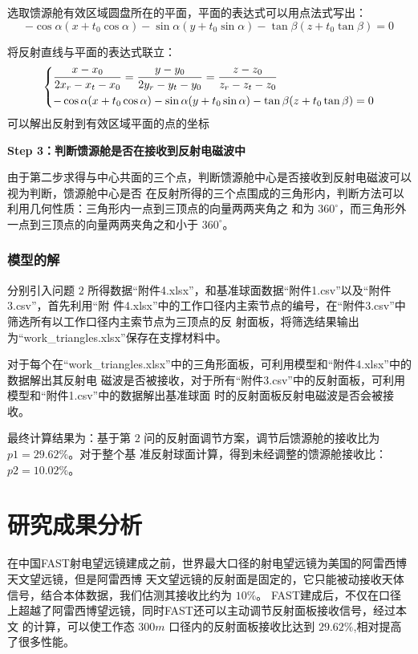 \documentclass[withoutpreface,bwprint]{cumcmthesis} %
\begin{document}
选取馈源舱有效区域圆盘所在的平面，平面的表达式可以用点法式写出：
\[
    -\cos\alpha(x + t_0\cos\alpha) - \sin\alpha(y + t_0\sin\alpha) - 
    \tan\beta(z + t_0\tan\beta) = 0 
\]

将反射直线与平面的表达式联立：
\[
    \begin{dcases}
        \frac{x-x_0}{2x_r-x_t-x_0} = \frac{y-y_0}{2y_r-y_t-y_0} = 
        \frac{z-z_0}{z_r-z_t-z_0}  \\
        -\cos\alpha(x + t_0\cos\alpha) - \sin\alpha(y + t_0\sin\alpha) - 
        \tan\beta(z + t_0\tan\beta) = 0 
    \end{dcases}
\]
可以解出反射到有效区域平面的点的坐标

\textbf{Step 3：判断馈源舱是否在接收到反射电磁波中}

由于第二步求得与中心共面的三个点，判断馈源舱中心是否接收到反射电磁波可以视为判断，馈源舱中心是否
在反射所得的三个点围成的三角形内，判断方法可以利用几何性质：三角形内一点到三顶点的向量两两夹角之
和为 $360^\circ$，而三角形外一点到三顶点的向量两两夹角之和小于 $360^\circ$。
\subsubsection{模型的解}
分别引入问题 $2$ 所得数据“附件4.xlsx”，和基准球面数据“附件1.csv”以及“附件3.csv”，首先利用“附
件4.xlsx”中的工作口径内主索节点的编号，在“附件3.csv”中筛选所有以工作口径内主索节点为三顶点的反
射面板，将筛选结果输出为“work\_triangles.xlsx”保存在支撑材料中。

对于每个在“work\_triangles.xlsx”中的三角形面板，可利用模型和“附件4.xlsx”中的数据解出其反射电
磁波是否被接收，对于所有“附件3.csv”中的反射面板，可利用模型和“附件1.csv”中的数据解出基准球面
时的反射面板反射电磁波是否会被接收。

最终计算结果为：基于第 $2$ 问的反射面调节方案，调节后馈源舱的接收比为 $p1 = 29.62\%$。对于整个基
准反射球面计算，得到未经调整的馈源舱接收比：$p2 = 10.02\%$。
\section{研究成果分析}
在中国FAST射电望远镜建成之前，世界最大口径的射电望远镜为美国的阿雷西博天文望远镜，但是阿雷西博
天文望远镜的反射面是固定的，它只能被动接收天体信号，结合本体数据，我们估测其接收比约为 $10\%$。
FAST建成后，不仅在口径上超越了阿雷西博望远镜，同时FAST还可以主动调节反射面板接收信号，经过本文
的计算，可以使工作态 $300m$ 口径内的反射面板接收比达到 $29.62\%$,相对提高了很多性能。
\end{document}
